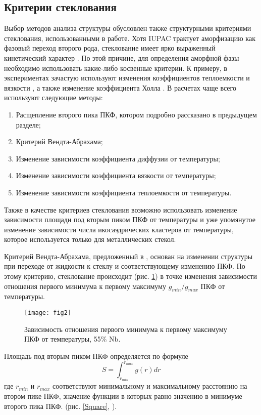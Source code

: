 \subsection{Критерии стеклования}
Выбор методов анализа структуры обусловлен также структурными критериями стеклования, использованными в работе. Хотя IUPAC трактует аморфизацию как фазовый переход второго рода, стеклование имеет ярко выраженный кинетический характер \cite{Dandar}. По этой причине, для определения аморфной фазы необходимо использовать какие-либо косвенные критерии. К примеру, в экспериментах зачастую используют изменения коэффициентов теплоемкости \cite{tropin2015heat} и вязкости \cite{konstantinova2009kinematicheskaya}, а также изменение коэффициента Холла \cite{Kuzmenko}. В расчетах чаще всего используют следующие методы:
\begin{enumerate}
	\item Расщепление второго пика ПКФ, котором подробно рассказано в предыдущем разделе;
	\item Критерий Вендта-Абрахама;
	\item Изменение зависимости коэффициента диффузии от температуры;
	\item Изменение зависимости коэффициента вязкости от температуры;
	\item Изменение зависимости коэффициента теплоемкости от температуры.
\end{enumerate}

Также в качестве критериев стеклования возможно использовать изменение зависимости площади под вторым пиком ПКФ от температуры \cite{Kolotova} и уже упомянутое изменение зависимости числа икосаэдрических кластеров от температуры, которое используется только для металлических стекол. 

Критерий Вендта-Абрахама, предложенный в \cite{Wendt}, основан на изменении  структуры при переходе от жидкости к стеклу и соответствующему изменению ПКФ. По этому критерию,  стеклование происходит  (рис. \ref{VA_criterium_lit}) в точке изменения зависимости отношения первого минимума к первому максимуму $g_{min}/g_{max}$ ПКФ от температуры.
\begin{figure}[h!]
	\begin{center}
		\texttt{[image: fig2]}{}{}{}
		\caption{Зависимость отношения первого минимума к первому максимуму ПКФ от температуры, 55\% Nb.}
		\label{VA_criterium_lit}
	\end{center}
\end{figure}
Площадь под вторым пиком ПКФ определяется по формуле
\begin{equation}
\label{eq_2}
S = \int_{r_{min}}^{r_{max}} g(r)dr
\end{equation}
где $r_{min}$  и $r_{max}$  соответствуют минимальному и максимальному расстоянию на втором пике ПКФ, значение функции в которых равно значению в минимуме второго пика ПКФ. (рис. \ref{Square}, \cite{Kolotova}).


